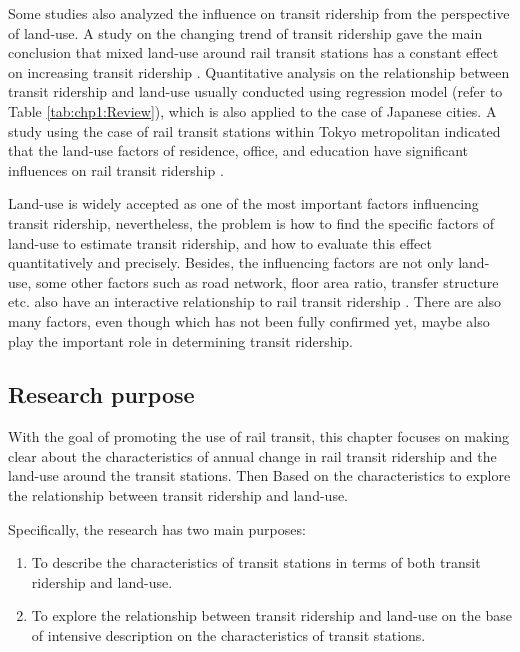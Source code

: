 %
Some studies also analyzed the influence on transit ridership from the perspective of land-use. A study on the changing trend of transit ridership gave the main conclusion that mixed land-use around rail transit stations has a constant effect on increasing transit ridership \cite{nakamura2015study}. Quantitative analysis on the relationship between transit ridership and land-use usually conducted using regression model (refer to Table \ref{tab:chp1:Review}), which is also applied to the case of Japanese cities. A study using the case of rail transit stations within Tokyo metropolitan indicated that the land-use factors of residence, office, and education have significant influences on rail transit ridership \cite{tadakatsu2015empirical}.

%
Land-use is widely accepted as one of the most important factors influencing transit ridership, nevertheless, the problem is how to find the specific factors of land-use to estimate transit ridership, and how to evaluate this effect quantitatively and precisely. Besides, the influencing factors are not only land-use, some other factors such as road network, floor area ratio, transfer structure etc. also have an interactive relationship to rail transit ridership \cite{kondo2010railway,inohae2009study}. There are also many factors, even though which has not been fully confirmed yet, maybe also play the important role in determining transit ridership.

%
\subsection{Research purpose}
%
With the goal of promoting the use of rail transit, this chapter focuses on making clear about the characteristics of annual change in rail transit ridership and the land-use around the transit stations. Then Based on the characteristics to explore the relationship between transit ridership and land-use. 

%
Specifically, the research has two main purposes: 
\begin{enumerate}
	\setlength{\parskip}{0\baselineskip} %
	\item To describe the characteristics of transit stations in terms of both transit ridership and land-use.  
	\item To explore the relationship between transit ridership and land-use on the base of intensive description on the characteristics of transit stations. 
	\setlength{\parskip}{0.7\baselineskip} %
\end{enumerate}

